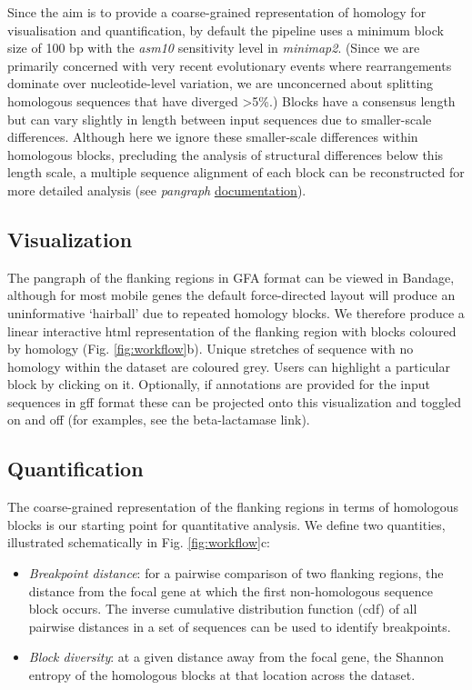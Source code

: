 \documentclass[rmp,superscriptaddress,11pt]{revtex4-1}
\begin{document}
Since the aim is to provide a coarse-grained representation of homology for visualisation and quantification, by default the pipeline uses a minimum block size of 100 bp with the \textit{asm10} sensitivity level in \textit{minimap2}. (Since we are primarily concerned with very recent evolutionary events where rearrangements dominate over nucleotide-level variation, we are unconcerned about splitting homologous sequences that have diverged >5\%.) Blocks have a consensus length but can vary slightly in length between input sequences due to smaller-scale differences. Although here we ignore these smaller-scale differences within homologous blocks, precluding the analysis of structural differences below this length scale, a multiple sequence alignment of each block can be reconstructed for more detailed analysis (see \textit{pangraph} \href{https://neherlab.github.io/pangraph/tutorials/tutorial_3/}{documentation}). \par

\subsection*{Visualization}

\noindent The pangraph of the flanking regions in GFA format can be viewed in Bandage, although for most mobile genes the default force-directed layout will produce an uninformative `hairball' due to repeated homology blocks. We therefore produce a linear interactive html representation of the flanking region with blocks coloured by homology (Fig. \ref{fig:workflow}b).  Unique stretches of sequence with no homology within the dataset are coloured grey. Users can highlight a particular block by clicking on it. Optionally, if annotations are provided for the input sequences in gff format these can be projected onto this visualization and toggled on and off (for examples, see the beta-lactamase link).

\subsection*{Quantification}

\noindent The coarse-grained representation of the flanking regions in terms of homologous blocks is our starting point for quantitative analysis. We define two quantities, illustrated schematically in Fig. \ref{fig:workflow}c:

\begin{itemize}
    \item \textit{Breakpoint distance}: for a pairwise comparison of two flanking regions, the distance from the focal gene at which the first non-homologous sequence block occurs. The inverse cumulative distribution function (cdf) of all pairwise distances in a set of sequences can be used to identify breakpoints.
    \item \textit{Block diversity}: at a given distance away from the focal gene, the Shannon entropy of the homologous blocks at that location across the dataset. 
\end{itemize}
\end{document}
